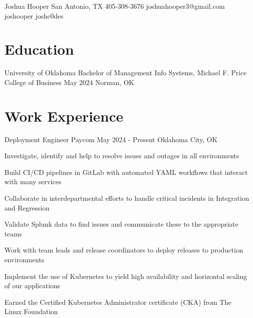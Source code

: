 \documentclass[letterpaper]{resumeconfig}
\begin{document}
\Header
    {Joshua Hooper} %
    {San Antonio, TX} %
    {405-308-3676} %
    {joshuahooper3@gmail.com} %
    {joshooper} %
    {joshc0des} %

\vspace{-0.8em}
\section{Education}

\Education
    {University of Oklahoma} %
    {Bachelor of Management Info Systems, Michael F. Price College of Business} %
    {May 2024} %
    {Norman, OK} %
    \vspace{-1em}

\vspace{-0.8em}
\section{Work Experience}

\WorkExperience
	{Deployment Engineer} %
	{Paycom} %
	{May 2024 - Present} %
	{Oklahoma City, OK} %
	{
		\item Investigate, identify and help to resolve issues and outages in all environments
		\item Build CI/CD pipelines in GitLab with automated YAML workflows that interact with many services
		\item Collaborate in interdepartmental efforts to handle critical incidents in Integration and Regression
		\item Validate Splunk data to find issues and communicate these to the appropriate teams
		\item Work with team leads and release coordinators to deploy releases to production environments
		\item Implement the use of Kubernetes to yield high availability and horizontal scaling of our applications
		\item Earned the Certified Kubernetes Administrator certificate (CKA) from The Linux Foundation
	}
	\vspace{1em}
\end{document}
